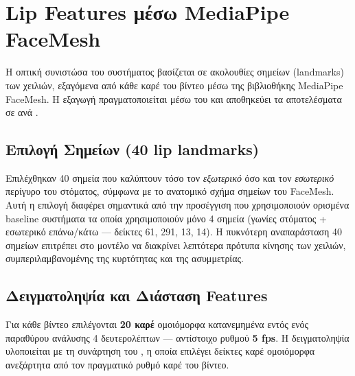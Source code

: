 \section{Lip Features μέσω MediaPipe FaceMesh}
\label{sec:lip-features}

Η οπτική συνιστώσα του συστήματος βασίζεται σε ακολουθίες σημείων
(landmarks) των χειλιών, εξαγόμενα από κάθε καρέ του βίντεο μέσω της
βιβλιοθήκης MediaPipe FaceMesh.
Η εξαγωγή πραγματοποιείται μέσω του 
και αποθηκεύει τα αποτελέσματα σε  ανά .

\subsection{Επιλογή Σημείων (40 lip landmarks)}
\label{subsec:lip-landmarks}

Επιλέχθηκαν 40 σημεία που καλύπτουν τόσο τον \emph{εξωτερικό} όσο και τον
\emph{εσωτερικό} περίγυρο του στόματος, σύμφωνα με το ανατομικό σχήμα
σημείων του FaceMesh.
Αυτή η επιλογή διαφέρει σημαντικά από την προσέγγιση που χρησιμοποιούν
ορισμένα baseline συστήματα τα οποία χρησιμοποιούν μόνο 4 σημεία
(γωνίες στόματος + εσωτερικό επάνω/κάτω — δείκτες 61, 291, 13, 14).
Η πυκνότερη αναπαράσταση 40 σημείων επιτρέπει στο μοντέλο να διακρίνει
λεπτότερα πρότυπα κίνησης των χειλιών, συμπεριλαμβανομένης της κυρτότητας
και της ασυμμετρίας.

\subsection{Δειγματοληψία και Διάσταση Features}
\label{subsec:lip-sampling}

Για κάθε βίντεο επιλέγονται \textbf{20 καρέ} ομοιόμορφα κατανεμημένα
εντός ενός παραθύρου ανάλυσης 4 δευτερολέπτων — αντίστοιχο ρυθμού
\textbf{5 fps}.
Η δειγματοληψία υλοποιείται με τη συνάρτηση  του
, η οποία επιλέγει δείκτες καρέ ομοιόμορφα
ανεξάρτητα από τον πραγματικό ρυθμό καρέ του βίντεο.

